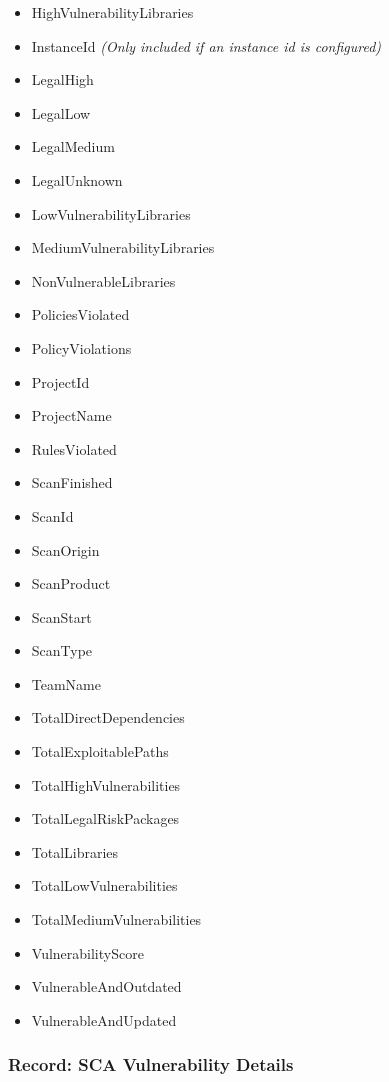 \begin{itemize}

    \item HighVulnerabilityLibraries
    \item InstanceId \textit{(Only included if an instance id is configured)}
    \item LegalHigh
    \item LegalLow
    \item LegalMedium
    \item LegalUnknown
    \item LowVulnerabilityLibraries
    \item MediumVulnerabilityLibraries
    \item NonVulnerableLibraries
    \item PoliciesViolated
    \item PolicyViolations
    \item ProjectId
    \item ProjectName
    \item RulesViolated
    \item ScanFinished
    \item ScanId
    \item ScanOrigin
    \item ScanProduct
    \item ScanStart
    \item ScanType
    \item TeamName
    \item TotalDirectDependencies
    \item TotalExploitablePaths
    \item TotalHighVulnerabilities
    \item TotalLegalRiskPackages
    \item TotalLibraries
    \item TotalLowVulnerabilities
    \item TotalMediumVulnerabilities
    \item VulnerabilityScore
    \item VulnerableAndOutdated
    \item VulnerableAndUpdated
\end{itemize}


\subsubsection{Record: SCA Vulnerability Details}

